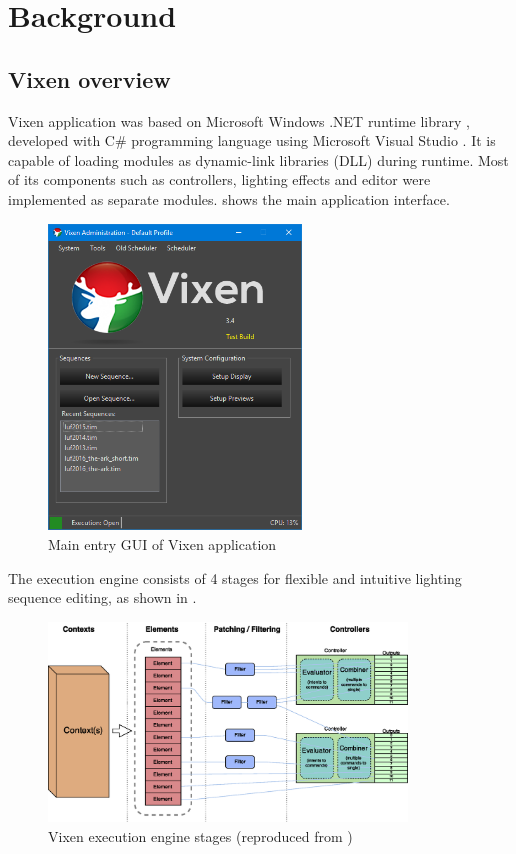 \chapter{Background}
\renewcommand{\baselinestretch}{\mystretch}
\label{chap:BG}

\section{Vixen overview}

 Vixen application was based on Microsoft Windows .NET runtime library \cite{platt2002introducing}, developed with C\# programming language \cite{hejlsberg2003c} using Microsoft Visual Studio \cite{msvs}. It is capable of loading modules as dynamic-link libraries (DLL) during runtime. Most of its components such as controllers, lighting effects and editor were implemented as separate modules.  shows the main application interface.

\begin{figure}[!t]
  \centering
  \includegraphics[width=0.6\textwidth]{Figs//vixen_main.png}
  \caption{\footnotesize Main entry GUI of Vixen application}
  \label{fig:vixen-main}
\end{figure}

The execution engine consists of 4 stages for flexible and intuitive lighting sequence editing, as shown in .

\begin{figure}[!t]
  \centering
  \includegraphics[width=0.85\textwidth]{Figs//V3-Engine-1.eps}
  \caption{\footnotesize Vixen execution engine stages (reproduced from \cite{vixen})}
  \label{fig:stages}
\end{figure}

